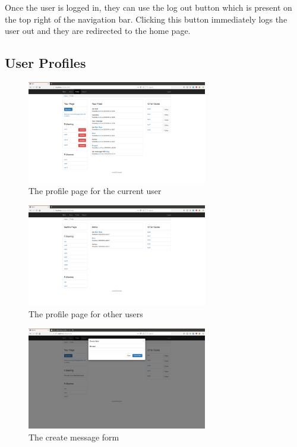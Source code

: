 Once the user is logged in, they can use the log out button which is present
on the top right of the navigation bar. Clicking this button immediately logs
the user out and they are redirected to the home page.

\subsection{User Profiles}

\begin{figure}[H]
    \centering
    \includegraphics[width=0.7\textwidth]{final_report/pics/profile.png}
    \caption{The profile page for the current user}
    \label{fig:wireProfile}
\end{figure}

\begin{figure}[H]
    \centering
    \includegraphics[width=0.7\textwidth]{final_report/pics/otherProfile.png}
    \caption{The profile page for other users}
    \label{fig:wireOtherProfile}
\end{figure}

\begin{figure}[H]
    \centering
    \includegraphics[width=0.7\textwidth]{final_report/pics/createWireForm.png}
    \caption{The create message form}
    \label{fig:wireCreateForm}
\end{figure}


